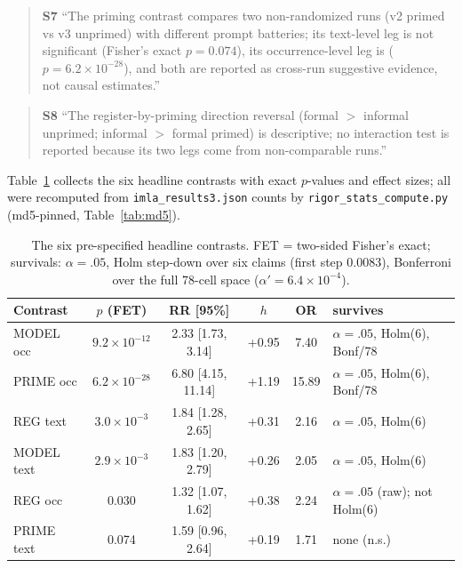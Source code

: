 \documentclass[11pt]{article}
\begin{document}
\begin{quote}\small
\textbf{S7} ``The priming contrast compares two non-randomized runs (v2 primed vs v3 unprimed) with different prompt batteries; its text-level leg is not significant (Fisher's exact $p = 0.074$), its occurrence-level leg is ($p = 6.2\times10^{-28}$), and both are reported as cross-run suggestive evidence, not causal estimates.''
\end{quote}

\begin{quote}\small
\textbf{S8} ``The register-by-priming direction reversal (formal $>$ informal unprimed; informal $>$ formal primed) is descriptive; no interaction test is reported because its two legs come from non-comparable runs.''
\end{quote}

Table~\ref{tab:contrasts} collects the six headline contrasts with exact $p$-values and effect sizes; all were recomputed from \texttt{imla\_results3.json} counts by \texttt{rigor\_stats\_compute.py} (md5-pinned, Table~\ref{tab:md5}).

\begin{table}[t]
\centering
\small
\begin{tabular}{lccccl}
\toprule
Contrast & $p$ (FET) & RR [95\%] & $h$ & OR & survives \\
\midrule
MODEL occ & $9.2\times10^{-12}$ & 2.33 [1.73, 3.14] & +0.95 & 7.40 & $\alpha=.05$, Holm(6), Bonf/78 \\
PRIME occ & $6.2\times10^{-28}$ & 6.80 [4.15, 11.14] & +1.19 & 15.89 & $\alpha=.05$, Holm(6), Bonf/78 \\
REG text & $3.0\times10^{-3}$ & 1.84 [1.28, 2.65] & +0.31 & 2.16 & $\alpha=.05$, Holm(6) \\
MODEL text & $2.9\times10^{-3}$ & 1.83 [1.20, 2.79] & +0.26 & 2.05 & $\alpha=.05$, Holm(6) \\
REG occ & 0.030 & 1.32 [1.07, 1.62] & +0.38 & 2.24 & $\alpha=.05$ (raw); not Holm(6) \\
PRIME text & 0.074 & 1.59 [0.96, 2.64] & +0.19 & 1.71 & none (n.s.) \\
\bottomrule
\end{tabular}
\caption{The six pre-specified headline contrasts. FET = two-sided Fisher's exact; survivals: $\alpha=.05$, Holm step-down over six claims (first step 0.0083), Bonferroni over the full 78-cell space ($\alpha'{=}6.4\times10^{-4}$).}
\label{tab:contrasts}
\end{table}
\end{document}
